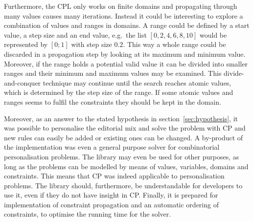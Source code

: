 Furthermore, the CPL only works on finite domains and propagating through many values causes many iterations. Instead it could be interesting to explore a combination of values and ranges in domains. A range could be defined by a start value, a step size and an end value, e.g.\ the list $[0,2,4,6,8,10]$ would be represented by $[0;1]$ with step size $0.2$. This way a whole range could be discarded in a propagation step by looking at its maximum and minimum value. Moreover, if the range holds a potential valid value it can be divided into smaller ranges and their minimum and maximum values may be examined. This divide-and-conquer technique may continue until the search reaches atomic values, which is determined by the step size of the range. If some atomic values and ranges seems to fulfil the constraints they should be kept in the domain.

Moreover, as an answer to the stated hypothesis in section~\vref{sec:hypothesis}, it was possible to personalise the editorial mix and solve the problem with CP and new rules can easily be added or existing ones can be changed. A by-product of the implementation was even a general purpose solver for combinatorial personalisation problems. The library may even be used for other purposes, as long as the problems can be modelled by means of values, variables, domains and constraints. This means that CP was indeed applicable to personalisation problems. The library should, furthermore, be understandable for developers to use it, even if they do not have insight in CP. Finally, it is prepared for implementation of constraint propagation and an automatic ordering of constraints, to optimise the running time for the solver.

